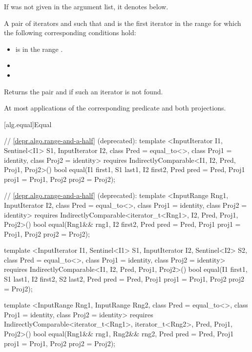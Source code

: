 \begin{itemdescr}
\pnum
\remarks If  was not given in the argument list, it denotes
 below.

\pnum
\returns
A pair of iterators
and
such that
and
is the first iterator
in the range 
for which the following corresponding conditions hold:

\begin{itemize}
\item {} is in the range \tcode{[first2, last2)}.
\item {}
\item {}
\end{itemize}

Returns the pair
and
if such an iterator
is not found.

\pnum
\complexity
At most
applications of the corresponding predicate and both projections.
\end{itemdescr}

[alg.equal]{Equal}

%
\begin{itemdecl}
// \ref{depr.algo.range-and-a-half} (deprecated):
template <InputIterator I1, Sentinel<I1> S1, InputIterator I2,
    class Pred = equal_to<>, class Proj1 = identity, class Proj2 = identity>
  requires IndirectlyComparable<I1, I2, Pred, Proj1, Proj2>()
  bool equal(I1 first1, S1 last1,
             I2 first2, Pred pred = Pred{},
             Proj1 proj1 = Proj1{}, Proj2 proj2 = Proj2{});

// \ref{depr.algo.range-and-a-half} (deprecated):
template <InputRange Rng1, InputIterator I2, class Pred = equal_to<>,
    class Proj1 = identity, class Proj2 = identity>
  requires IndirectlyComparable<iterator_t<Rng1>, I2, Pred, Proj1, Proj2>()
  bool equal(Rng1&& rng1, I2 first2, Pred pred = Pred{},
             Proj1 proj1 = Proj1{}, Proj2 proj2 = Proj2{});

template <InputIterator I1, Sentinel<I1> S1, InputIterator I2, Sentinel<I2> S2,
    class Pred = equal_to<>, class Proj1 = identity, class Proj2 = identity>
  requires IndirectlyComparable<I1, I2, Pred, Proj1, Proj2>()
  bool equal(I1 first1, S1 last1, I2 first2, S2 last2,
             Pred pred = Pred{},
             Proj1 proj1 = Proj1{}, Proj2 proj2 = Proj2{});

template <InputRange Rng1, InputRange Rng2, class Pred = equal_to<>,
    class Proj1 = identity, class Proj2 = identity>
  requires IndirectlyComparable<iterator_t<Rng1>, iterator_t<Rng2>, Pred, Proj1, Proj2>()
  bool equal(Rng1&& rng1, Rng2&& rng2, Pred pred = Pred{},
             Proj1 proj1 = Proj1{}, Proj2 proj2 = Proj2{});
\end{itemdecl}

